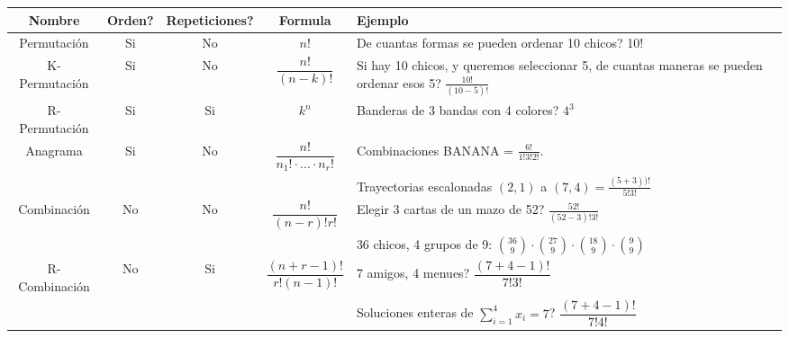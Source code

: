 \documentclass[11pt,a4paper]{article}
\begin{document}
\newpage
\begin{table}
{
\renewcommand{\arraystretch}{2}
\hspace{-1cm}
\begin{tabular}{|c|c|c|c|p{8.7cm}|}
\hline
Nombre & Orden? & Repeticiones? & Formula & Ejemplo \\
\hline
Permutaci\'on & Si & No & $n!$ & De cuantas formas se pueden ordenar 10 chicos? 10!\\
\hline
K-Permutaci\'on & Si & No & $\dfrac{n!}{(n-k)!}$ & Si hay 10 chicos, y queremos seleccionar 5, de cuantas maneras se pueden ordenar esos 5? $\frac{10!}{(10-5)!}$\\
\hline
R-Permutaci\'on & Si & Si & $k^n$ & Banderas de 3 bandas con 4 colores? $4^3$\\
\hline
Anagrama & Si & No & $\dfrac{n!}{n_1! \cdot ... \cdot n_r!}$ & Combinaciones BANANA = $\frac{6!}{1!3!2!}$. \\ & & & & Trayectorias escalonadas $(2,1)$ a $(7,4) = \frac{(5+3))!}{5!3!}$\\
\hline
Combinaci\'on & No & No & $\dfrac{n!}{(n-r)!r!}$ & Elegir 3 cartas de un mazo de 52? $\frac{52!}{(52-3)!3!}$ \\ & & & & 36 chicos, 4 grupos de 9: ${36 \choose 9} \cdot {27 \choose 9} \cdot {18 \choose 9} \cdot {9 \choose 9}$\\
\hline
R-Combinaci\'on & No & Si & $\dfrac{(n+r-1)!}{r!(n-1)!}$ & 7 amigos, 4 menues? $\dfrac{(7+4-1)!}{7!3!}$ \\ & & & & Soluciones enteras de $\sum_{i=1}^4 x_i = 7$? $\dfrac{(7+4-1)!}{7!4!}$\\
\hline
\end{tabular}
}
\end{table}
\end{document}
